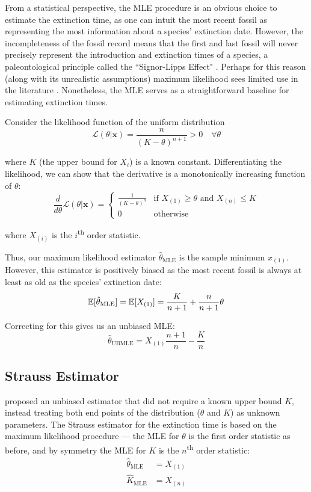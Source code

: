 From a statistical perspective, the MLE procedure is an obvious choice to estimate the extinction time, as one can intuit the most recent fossil as representing the most information about a species' extinction date. However, the incompleteness of the fossil record means that the first and last fossil will never precisely represent the introduction and extinction times of a species, a paleontological principle called the ``Signor-Lipps Effect" \parencite{Signor1982}. Perhaps for this reason (along with its unrealistic assumptions) maximum likelihood sees limited use in the literature \parencite{Ludwig1996, Jaric2016}. Nonetheless, the MLE serves as a straightforward baseline for estimating extinction times.

Consider the likelihood function of the uniform distribution
\[
\mathcal{L}(\theta | \bm{x}) =  \frac{n}{(K - \theta)^{n+1}} > 0 \quad \forall \theta
\]

where $K$ (the upper bound for $X_i$) is a known constant. Differentiating the likelihood, we can show that the derivative is a monotonically increasing function of $\theta$:
\[
\frac{d}{d\theta}\mathcal{L}(\theta | \bm{x} ) = \begin{cases}
    \frac{1}{(K-\theta)^n} & \text{if $X_{(1)} \geq \theta$ and $X_{(n)} \leq K$} \\
    0 & \text{otherwise}
\end{cases}
\]

where $X_{(i)}$ is the $i$\textsuperscript{th} order statistic.

Thus, our maximum likelihood estimator $\hat\theta_{\text{MLE}}$ is the sample minimum $x_{(1)}$. However, this estimator is positively biased as the most recent fossil is always at least as old as the species' extinction date:
\[
    \mathbb{E}[\hat\theta_{\text{MLE}}] = \mathbb{E}[X_{(1)}] = \frac{K}{n+1} + \frac{n}{n+1}\theta
\]

Correcting for this gives us an unbiased MLE:
\begin{equation}\label{eq:ubmle}
    \hat\theta_{\text{UBMLE}} = X_{(1)} \frac{n+1}{n} - \frac{K}{n}
\end{equation}

\subsection{Strauss Estimator}

\textcite{Strauss1989} proposed an unbiased estimator that did not require a known upper bound $K$, instead treating both end points of the distribution ($\theta$ and $K$) as unknown parameters. The Strauss estimator for the extinction time is based on the maximum likelihood procedure --- the MLE for $\theta$ is the first order statistic as before, and by symmetry the MLE for $K$ is the $n$\textsuperscript{th} order statistic:
\begin{align*}
    \hat\theta_{\text{MLE}} &= X_{(1)} \\
    \hat K_{\text{MLE}} &= X_{(n)}
\end{align*}

